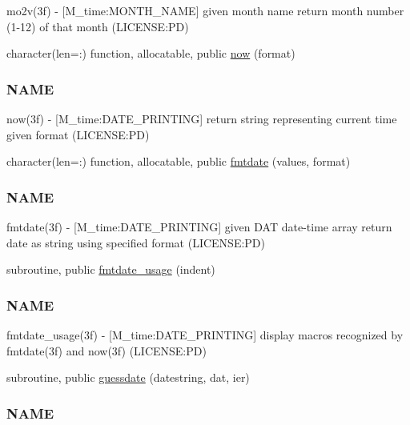 \begin{DoxyCompactItemize}
\begin{DoxyCompactList}
mo2v(3f) -\/ \mbox{[}M\+\_\+time\+:M\+O\+N\+T\+H\+\_\+\+N\+A\+ME\mbox{]} given month name return month number (1-\/12) of that month (L\+I\+C\+E\+N\+SE\+:PD) \end{DoxyCompactList}\item 
character(len=\+:) function, allocatable, public \mbox{\hyperlink{namespacem__time_a6b5e87be0e510ff268c1ecfbf67a3bdb}{now}} (format)
\begin{DoxyCompactList}\small\item\em \subsubsection*{N\+A\+ME}

now(3f) -\/ \mbox{[}M\+\_\+time\+:D\+A\+T\+E\+\_\+\+P\+R\+I\+N\+T\+I\+NG\mbox{]} return string representing current time given format (L\+I\+C\+E\+N\+SE\+:PD) \end{DoxyCompactList}\item 
character(len=\+:) function, allocatable, public \mbox{\hyperlink{namespacem__time_a2cb84c9b8af4f395b76aed76e1431328}{fmtdate}} (values, format)
\begin{DoxyCompactList}\small\item\em \subsubsection*{N\+A\+ME}

fmtdate(3f) -\/ \mbox{[}M\+\_\+time\+:D\+A\+T\+E\+\_\+\+P\+R\+I\+N\+T\+I\+NG\mbox{]} given D\+AT date-\/time array return date as string using specified format (L\+I\+C\+E\+N\+SE\+:PD) \end{DoxyCompactList}\item 
subroutine, public \mbox{\hyperlink{namespacem__time_a914927f70fb9495af1be2e484b967111}{fmtdate\+\_\+usage}} (indent)
\begin{DoxyCompactList}\small\item\em \subsubsection*{N\+A\+ME}

fmtdate\+\_\+usage(3f) -\/ \mbox{[}M\+\_\+time\+:D\+A\+T\+E\+\_\+\+P\+R\+I\+N\+T\+I\+NG\mbox{]} display macros recognized by fmtdate(3f) and now(3f) (L\+I\+C\+E\+N\+SE\+:PD) \end{DoxyCompactList}\item 
subroutine, public \mbox{\hyperlink{namespacem__time_aa5198c7aa4f3d8411c8ce93046ce3794}{guessdate}} (datestring, dat, ier)
\begin{DoxyCompactList}\small\item\em \subsubsection*{N\+A\+ME}


\end{DoxyCompactList}
\end{DoxyCompactItemize}
